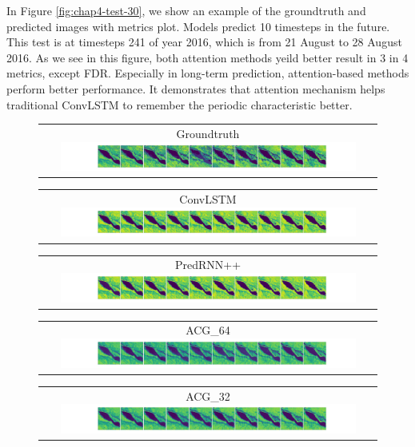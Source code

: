 In Figure \ref{fig:chap4-test-30}, we show an example of the groundtruth and predicted images with metrics plot. Models predict 10 timesteps in the future. This test is at timesteps 241 of year 2016, which is from 21 August to 28 August 2016. As we see in this figure, both attention methods yeild better result in 3 in 4 metrics, except FDR. Especially in long-term prediction, attention-based methods perform better performance. It demonstrates that attention mechanism helps traditional ConvLSTM to remember the periodic characteristic better.  

\begin{figure}
    \begin{center}
        \begin{tabular}[b]{c}
            \small Groundtruth \enspace
            \includegraphics[width=0.9\textwidth]{figures/chap4/10/30/groundtruth.png} \\
        \end{tabular}
        \begin{tabular}[b]{c}
            \small ConvLSTM \quad
            \includegraphics[width=0.9\textwidth]{figures/chap4/10/30/convlstm.png} \\
        \end{tabular}
        \begin{tabular}[b]{c}
            \small PredRNN++
            \includegraphics[width=0.9\textwidth]{figures/chap4/10/30/predrnn_pp.png} \\
        \end{tabular}
        \begin{tabular}[b]{c}
            \small ACG\_64 \qquad
            \includegraphics[width=0.9\textwidth]{figures/chap4/10/30/attention_clstm_grid.png} \\
        \end{tabular}
        \begin{tabular}[b]{c}
            \small ACG\_32 \qquad
            \includegraphics[width=0.9\textwidth]{figures/chap4/10/30/attention_clstm_grid_32.png} \\
        \end{tabular}


\end{center}
\end{figure}
